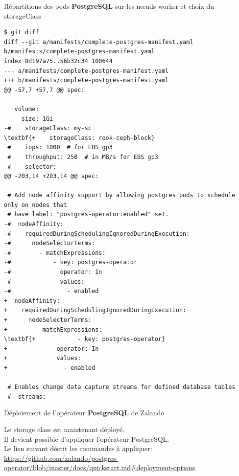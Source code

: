 \begin{frame}[shrink=5,fragile]{Répartitions des pods \textbf{PostgreSQL} sur les n{\oe}uds worker et choix du storageClass}

\begin{tiny}
\begin{Verbatim}[commandchars=\\\{\}]
$ git diff
diff --git a/manifests/complete-postgres-manifest.yaml b/manifests/complete-postgres-manifest.yaml
index 8d197a75..56b32c34 100644
--- a/manifests/complete-postgres-manifest.yaml
+++ b/manifests/complete-postgres-manifest.yaml
@@ -57,7 +57,7 @@ spec:
 
   volume:
     size: 1Gi
-#    storageClass: my-sc
\textbf{+    storageClass: rook-ceph-block}
 #    iops: 1000  # for EBS gp3
 #    throughput: 250  # in MB/s for EBS gp3
 #    selector:
@@ -203,14 +203,14 @@ spec:
 
 # Add node affinity support by allowing postgres pods to schedule only on nodes that
 # have label: "postgres-operator:enabled" set.
-#  nodeAffinity:
-#    requiredDuringSchedulingIgnoredDuringExecution:
-#      nodeSelectorTerms:
-#        - matchExpressions:
-#            - key: postgres-operator
-#              operator: In
-#              values:
-#                - enabled
+  nodeAffinity:
+    requiredDuringSchedulingIgnoredDuringExecution:
+      nodeSelectorTerms:
+        - matchExpressions:
\textbf{+            - key: postgres-operator}
+              operator: In
+              values:
+                - enabled
 
 # Enables change data capture streams for defined database tables
 #  streams:
\end{Verbatim}
\end{tiny}

\end{frame}


\begin{frame}[fragile]{Déploiement de l'opérateur \textbf{PostgreSQL} de Zalando}

Le storage class est maintenant déployé.\\
Il devient possible d'appliquer l'opérateur PostgreSQL.\\
Le lien suivant décrit les commandes à appliquer:\\
\tiny{\url{https://github.com/zalando/postgres-operator/blob/master/docs/quickstart.md#deployment-options}}

\end{frame}


